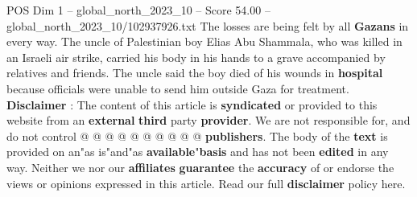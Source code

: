 \begin{textsample}{POS Dim 1 – global\_north\_2023\_10 – Score 54.00 – global\_north\_2023\_10/102937926.txt}
The losses are being felt by all \textbf{Gazans} in every way.
The uncle of Palestinian boy Elias Abu Shammala, who was killed in an Israeli air strike, carried his body in his hands to a grave accompanied by relatives and friends.
The uncle said the boy died of his wounds in \textbf{hospital} because officials were unable to send him outside Gaza for treatment. \textbf{Disclaimer} : The content of this article is \textbf{syndicated} or provided to this website from an \textbf{external} \textbf{third} party \textbf{provider}.
We are not responsible for, and do not control @ @ @ @ @ @ @ @ @ @ \textbf{publishers}.
The body of the \textbf{text} is provided on an"as is"and"as \textbf{available}"\textbf{basis} and has not been \textbf{edited} in any way.
Neither we nor our \textbf{affiliates} \textbf{guarantee} the \textbf{accuracy} of or endorse the views or opinions expressed in this article.
Read our full \textbf{disclaimer} policy here.

\end{textsample}
